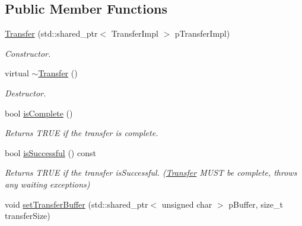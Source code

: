 \subsection*{Public Member Functions}
\begin{DoxyCompactItemize}
\item 
\hypertarget{class_lib_u_s_b_1_1_transfer_afd32a556e274e2bb6eddb7d1490049dd}{\hyperlink{class_lib_u_s_b_1_1_transfer_afd32a556e274e2bb6eddb7d1490049dd}{Transfer} (std\-::shared\-\_\-ptr$<$ Transfer\-Impl $>$ p\-Transfer\-Impl)}\label{class_lib_u_s_b_1_1_transfer_afd32a556e274e2bb6eddb7d1490049dd}

\begin{DoxyCompactList}\small\item\em Constructor. \end{DoxyCompactList}\item 
\hypertarget{class_lib_u_s_b_1_1_transfer_ad34f40b2ff13df7906654211179e35be}{virtual \hyperlink{class_lib_u_s_b_1_1_transfer_ad34f40b2ff13df7906654211179e35be}{$\sim$\-Transfer} ()}\label{class_lib_u_s_b_1_1_transfer_ad34f40b2ff13df7906654211179e35be}

\begin{DoxyCompactList}\small\item\em Destructor. \end{DoxyCompactList}\item 
\hypertarget{class_lib_u_s_b_1_1_transfer_aecca9fae023e6c92b33c45e9918aad0a}{bool \hyperlink{class_lib_u_s_b_1_1_transfer_aecca9fae023e6c92b33c45e9918aad0a}{is\-Complete} ()}\label{class_lib_u_s_b_1_1_transfer_aecca9fae023e6c92b33c45e9918aad0a}

\begin{DoxyCompactList}\small\item\em Returns T\-R\-U\-E if the transfer is complete. \end{DoxyCompactList}\item 
\hypertarget{class_lib_u_s_b_1_1_transfer_a98e88da8dd01ae9686cc9b54eab17c65}{bool \hyperlink{class_lib_u_s_b_1_1_transfer_a98e88da8dd01ae9686cc9b54eab17c65}{is\-Successful} () const }\label{class_lib_u_s_b_1_1_transfer_a98e88da8dd01ae9686cc9b54eab17c65}

\begin{DoxyCompactList}\small\item\em Returns T\-R\-U\-E if the transfer is\-Successful. (\hyperlink{class_lib_u_s_b_1_1_transfer}{Transfer} M\-U\-S\-T be complete, throws any waiting exceptions) \end{DoxyCompactList}\item 
\hypertarget{class_lib_u_s_b_1_1_transfer_aaf7d05f7b96cb98fd201ec9266da2fb6}{void \hyperlink{class_lib_u_s_b_1_1_transfer_aaf7d05f7b96cb98fd201ec9266da2fb6}{set\-Transfer\-Buffer} (std\-::shared\-\_\-ptr$<$ unsigned char $>$ p\-Buffer, size\-\_\-t transfer\-Size)}\label{class_lib_u_s_b_1_1_transfer_aaf7d05f7b96cb98fd201ec9266da2fb6}


\end{DoxyCompactItemize}

